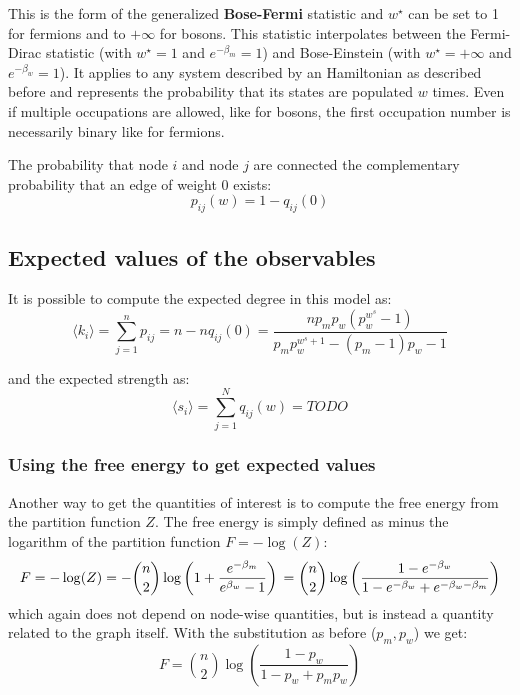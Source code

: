 \documentclass[a4paper]{article}
\begin{document}
This is the form of the generalized \textbf{Bose-Fermi} statistic and $w^\star$ can be set to 1 for fermions and to $+\infty$ for bosons. 
This statistic interpolates between the Fermi-Dirac statistic (with $w^\star=1$ and $e^{-\beta_m}=1$) and Bose-Einstein (with $w^\star=+\infty$ and $e^{-\beta_w}=1$).
It applies to any system described by an Hamiltonian as described before and represents the probability that its states are populated $w$ times.
Even if multiple occupations are allowed, like for bosons, the first occupation number is necessarily binary like for fermions.

The probability that node $i$ and node $j$ are connected the complementary probability that an edge of weight $0$ exists:
\begin{equation}
p_{ij}(w) = 1-q_{ij}(0)
\end{equation}

\subsection{Expected values of the observables}\label{expected-values-of-the-observables}

It is possible to compute the expected degree in this model as:
\begin{equation}
\langle k_i \rangle = \sum_{j=1}^n p_{ij} = n - n q_{ij}(0) = \frac{n p_m p_w \left(p_w^{w^s}-1\right)}{p_m p_w^{w^s+1}-\left(p_m-1\right) p_w-1}
\end{equation}


and the expected strength as:
\begin{equation}
\langle s_i \rangle = \sum_{j=1}^N q_{ij}(w) = TODO
\end{equation}

\subsubsection{Using the free energy to get expected
values}

Another way to get the quantities of interest is to compute the free
energy from the partition function $Z$. 
The free energy is simply
defined as minus the logarithm of the partition function $F=-\log(Z)$:
\begin{equation}
F = -\log(Z) = -\binom{n}{2}\log \left( 1 + \frac{e^{-\beta_m}}{e^{\beta_w} - 1} \right) \\ =
\binom{n}{2} \log \left( \frac{1-e^{-\beta_w}}{1-e^{-\beta_w} + e^{-\beta_w-\beta_m}}\right)
\end{equation}
which again does not depend on node-wise quantities, but is instead a quantity related to the graph itself. 
With the substitution as before ($p_m, p_w$) we get:
\begin{equation}
F = \binom{n}{2} \log \left( \frac{1-p_w}{1-p_w + p_m p_w} \right)
\end{equation}
\end{document}
